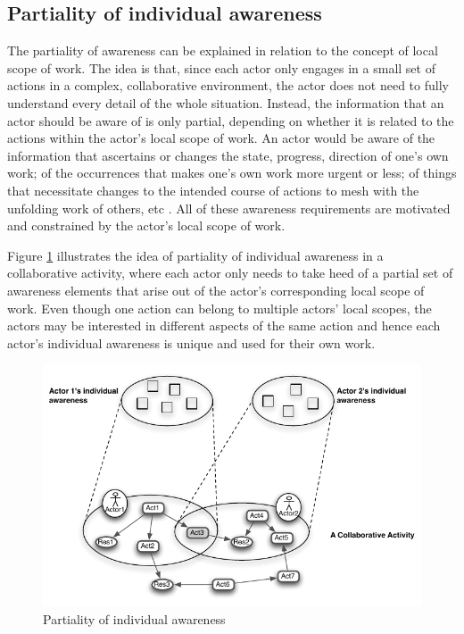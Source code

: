 \subsection{Partiality of individual awareness} %
\label{sub:partiality_of_awareness}
The partiality of awareness can be explained in relation to the concept of local scope of work. The idea is that, since each actor only engages in a small set of actions in a complex, collaborative environment, the actor does not need to fully understand every detail of the whole situation. Instead, the information that an actor should be aware of is only partial, depending on whether it is related to the actions within the actor's local scope of work. An actor would be aware of the information that ascertains or changes the state, progress, direction of one's own work; of the occurrences that makes one's own work more urgent or less; of things that necessitate changes to the intended course of actions to mesh with the unfolding work of others, etc \cite{schmidt2002a}. All of these awareness requirements are motivated and constrained by the actor's local scope of work.

Figure \ref{fig:partiality_of_awareness} illustrates the idea of partiality of individual awareness in a collaborative activity, where each actor only needs to take heed of a partial set of awareness elements that arise out of the actor's corresponding local scope of work. Even though one action can belong to multiple actors' local scopes, the actors may be interested in different aspects of the same action and hence each actor's individual awareness is unique and used for their own work.

\begin{figure}[htbp] %
   \centering
   \includegraphics{partiality_of_awareness.pdf} 
   \caption{Partiality of individual awareness}
   \label{fig:partiality_of_awareness}
\end{figure}

